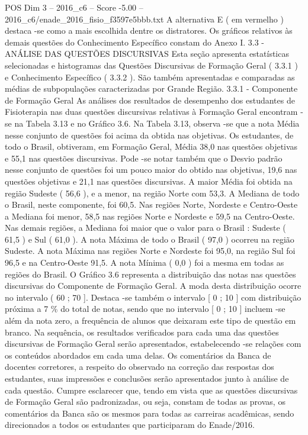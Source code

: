 \begin{textsample}{POS Dim 3 – 2016\_c6 – Score -5.00 – 2016\_c6/enade\_2016\_fisio\_f3597e5bbb.txt}
A alternativa E ( em vermelho ) destaca -se como a mais escolhida dentre os distratores.
Os gráficos relativos às demais questões do Conhecimento Específico constam do Anexo I. 3.3 - ANÁLISE DAS QUESTÕES DISCURSIVAS Esta seção apresenta estatísticas selecionadas e histogramas das Questões Discursivas de Formação Geral ( 3.3.1 ) e Conhecimento Específico ( 3.3.2 ).
São também apresentadas e comparadas as médias de subpopulações caracterizadas por Grande Região. 3.3.1 - Componente de Formação Geral As análises dos resultados de desempenho dos estudantes de Fisioterapia nas duas questões discursivas relativas à Formação Geral encontram -se na Tabela 3.13 e no Gráfico 3.6.
Na Tabela 3.13, observa -se que a nota Média nesse conjunto de questões foi acima da obtida nas objetivas.
Os estudantes, de todo o Brasil, obtiveram, em Formação Geral, Média 38,0 nas questões objetivas e 55,1 nas questões discursivas.
Pode -se notar também que o Desvio padrão nesse conjunto de questões foi um pouco maior do obtido nas objetivas, 19,6 nas questões objetivas e 21,1 nas questões discursivas.
A maior Média foi obtida na região Sudeste ( 56,6 ), e a menor, na região Norte com 53,3.
A Mediana de todo o Brasil, neste componente, foi 60,5.
Nas regiões Norte, Nordeste e Centro-Oeste a Mediana foi menor, 58,5 nas regiões Norte e Nordeste e 59,5 na Centro-Oeste.
Nas demais regiões, a Mediana foi maior que o valor para o Brasil : Sudeste ( 61,5 ) e Sul ( 61,0 ).
A nota Máxima de todo o Brasil ( 97,0 ) ocorreu na região Sudeste.
A nota Máxima nas regiões Norte e Nordeste foi 95,0, na região Sul foi 96,5 e na Centro-Oeste 91,5.
A nota Mínima ( 0,0 ) foi a mesma em todas as regiões do Brasil.
O Gráfico 3.6 representa a distribuição das notas nas questões discursivas do Componente de Formação Geral.
A moda desta distribuição ocorre no intervalo ( 60 ; 70 ].
Destaca -se também o intervalo [ 0 ; 10 ] com distribuição próxima a 7 \% do total de notas, sendo que no intervalo [ 0 ; 10 ] incluem -se além da nota zero, a frequência de alunos que deixaram este tipo de questão em branco.
Na sequência, os resultados verificados para cada uma das questões discursivas de Formação Geral serão apresentados, estabelecendo -se relações com os conteúdos abordados em cada uma delas.
Os comentários da Banca de docentes corretores, a respeito do observado na correção das respostas dos estudantes, suas impressões e conclusões serão apresentados junto à análise de cada questão.
Cumpre esclarecer que, tendo em vista que as questões discursivas de Formação Geral são padronizadas, ou seja, constam de todas as provas, os comentários da Banca são os mesmos para todas as carreiras acadêmicas, sendo direcionados a todos os estudantes que participaram do Enade/2016.

\end{textsample}
